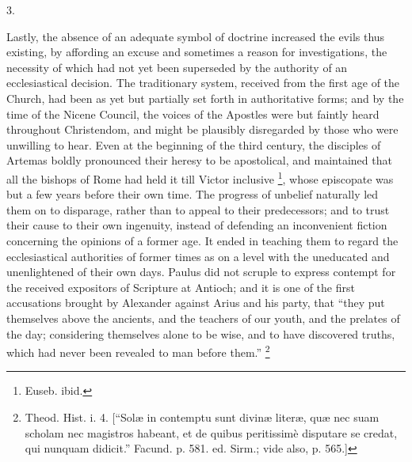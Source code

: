 3.

Lastly, the absence of an adequate symbol of doctrine increased the
evils thus existing, by affording an excuse and sometimes a reason for
investigations, the necessity of which had not yet been superseded by
the authority of an ecclesiastical decision. The traditionary system,
received from the first age of the Church, had been as yet but
partially set forth in authoritative forms; and by the time of the
Nicene Council, the voices of the Apostles were but faintly heard
throughout Christendom, and might be plausibly disregarded by those
who were unwilling to hear. Even at the beginning of the third
century, the disciples of Artemas boldly pronounced their heresy to be
apostolical, and maintained that all the bishops of Rome had held it
till Victor inclusive \footnote{Euseb. ibid.}, whose episcopate was but a few years
before their own time. The progress of unbelief naturally led them on
to disparage, rather than to appeal to their predecessors; and to
trust their cause to their own ingenuity, instead of defending an
inconvenient fiction concerning the opinions of a former age. It ended
in teaching them to regard the ecclesiastical authorities of former
times as on a level with the uneducated and unenlightened of their own
days. Paulus did not scruple to express contempt for the received
expositors of Scripture at Antioch; and it is one of the first
accusations brought by Alexander against Arius and his party, that
``they put themselves above the ancients, and the teachers of our
youth, and the prelates of the day; considering themselves alone to be
wise, and to have discovered truths, which had never been revealed to
man before them.'' \footnote{Theod. Hist. i. 4. [``Solæ in contemptu sunt divinæ
literæ, quæ nec suam scholam nec magistros habeant, et de quibus
peritissimè disputare se credat, qui nunquam didicit.'' Facund.
p. 581. ed. Sirm.; vide also, p. 565.]}

